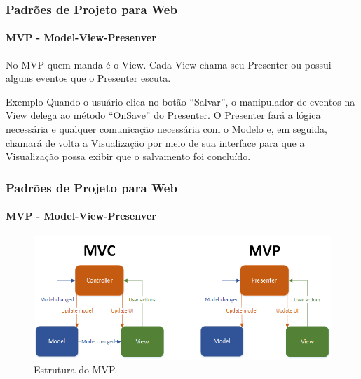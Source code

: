 \documentclass[
	10pt, %
	t, %
]{beamer}
\begin{document}
\begin{frame}
	\frametitle{Padrões de Projeto para Web}
	\framesubtitle{MVP - Model-View-Presenver}

	No MVP quem manda é o View. Cada View chama seu Presenter ou possui alguns eventos que o Presenter escuta.
	\begin{exampleblock}{Exemplo}
		Quando o usuário clica no botão “Salvar”, o manipulador de eventos na View delega ao método “OnSave” do Presenter. O Presenter fará a lógica necessária e qualquer comunicação necessária com o Modelo e, em seguida, chamará de volta a Visualização por meio de sua interface para que a Visualização possa exibir que o salvamento foi concluído.
	\end{exampleblock}

	
\end{frame}

\begin{frame}
	\frametitle{Padrões de Projeto para Web}
	\framesubtitle{MVP - Model-View-Presenver}

	\begin{figure}
		\centering
		\includegraphics[width=0.9\linewidth]{Images/mvc_mvp.png}
		\caption{Estrutura do MVP.}\label{fig:mvp}
	\end{figure}

\end{frame}
\end{document}
